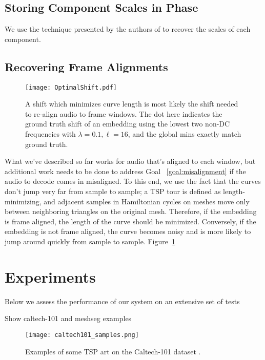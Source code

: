 \documentclass[runningheads]{llncs}
\begin{document}
\subsection{Storing Component Scales in Phase}
\label{sec:componentscales}

We use the technique presented by the authors of \cite{xiaoxiao_dong_data_2004} to recover the scales of each component.

\subsection{Recovering Frame Alignments}

\begin{figure}
  \centering
  \texttt{[image: OptimalShift.pdf]}
  \caption{A shift which minimizes curve length is most likely the shift needed to re-align audio to frame windows.  The dot here indicates the ground truth shift of an embedding using the lowest two non-DC frequencies with $\lambda=0.1, \ell=16$, and the global mins exactly match ground truth.}
  \label{fig:FrameAlignments}
\end{figure}

What we've described so far works for audio that's aligned to each window, but additional work needs to be done to address Goal ~\ref{goal:misalignment} if the audio to decode comes in misaligned.  To this end, we use the fact that the curves don't jump very far from sample to sample; a TSP tour is defined as length-minimizing, and adjacent samples in Hamiltonian cycles on meshes move only between neighboring triangles on the original mesh.  Therefore, if the embedding is frame aligned, the length of the curve should be minimized.  Conversely, if the embedding is not frame aligned, the curve becomes noisy and is more likely to jump around quickly from sample to sample.  Figure~\ref{fig:FrameAlignments}





\section{Experiments}
\label{sec:experiments}

Below we assess the performance of our system on an extensive set of tests

Show caltech-101 and meshseg examples

\begin{figure}
  \centering
  \texttt{[image: caltech101\_samples.png]}
  \caption{Examples of some TSP art on the Caltech-101 dataset \cite{li_andreeto_ranzato_perona_2022}.}
  \label{fig:caltech101examples}
\end{figure}
\end{document}
